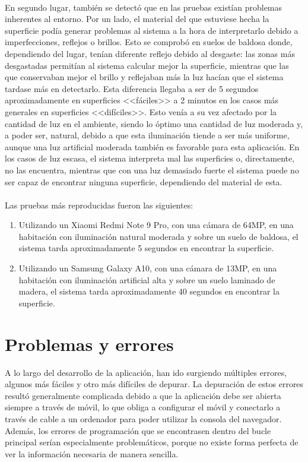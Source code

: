 \documentclass{subfiles}
\begin{document}
    \paragraph{}
    En segundo lugar, también se detectó que en las pruebas existían problemas inherentes al entorno. Por un lado, el material del que estuviese hecha la superficie podía generar problemas al sistema a la hora de interpretarlo debido a imperfecciones, reflejos o brillos. Esto se comprobó en suelos de baldosa donde, dependiendo del lugar, tenían diferente reflejo debido al desgaste: las zonas más desgastadas permitían al sistema calcular mejor la superficie, mientras que las que conservaban mejor el brillo y reflejaban más la luz hacían que el sistema tardase más en detectarlo. Esta diferencia llegaba a ser de 5 segundos aproximadamente en superficies <<fáciles>> a 2 minutos en los casos más generales en superficies <<difíciles>>. Esto venía a su vez afectado por la cantidad de luz en el ambiente, siendo lo óptimo una cantidad de luz moderada y, a poder ser, natural, debido a que esta iluminación tiende a ser más uniforme, aunque una luz artificial moderada también es favorable para esta aplicación. En los casos de luz escasa, el sistema interpreta mal las superficies o, directamente, no las encuentra, mientras que con una luz demasiado fuerte el sistema puede no ser capaz de encontrar ninguna superficie, dependiendo del material de esta.

    \paragraph{}
    Las pruebas más reproducidas fueron las siguientes:
    \begin{enumerate}
        \item Utilizando un Xiaomi Redmi Note 9 Pro, con una cámara de 64MP, en una habitación con iluminación natural moderada y sobre un suelo de baldosa, el sistema tarda aproximadamente 5 segundos en encontrar la superficie.
        \item Utilizando un Samsung Galaxy A10, con una cámara de 13MP, en una habitación con iluminación artificial alta y sobre un suelo laminado de madera, el sistema tarda aproximadamente 40 segundos en encontrar la superficie.
    \end{enumerate}

    \section{Problemas y errores}
    \label{sec:5.3}
    A lo largo del desarrollo de la aplicación, han ido surgiendo múltiples errores, algunos más fáciles y otro más difíciles de depurar. La depuración de estos errores resultó generalmente complicada debido a que la aplicación debe ser abierta siempre a través de móvil, lo que obliga a configurar el móvil y conectarlo a través de cable a un ordenador para poder utilizar la consola del navegador. Además, los errores de programación que se encontrasen dentro del bucle principal serían especialmente problemáticos, porque no existe forma perfecta de ver la información necesaria de manera sencilla.
\end{document}
